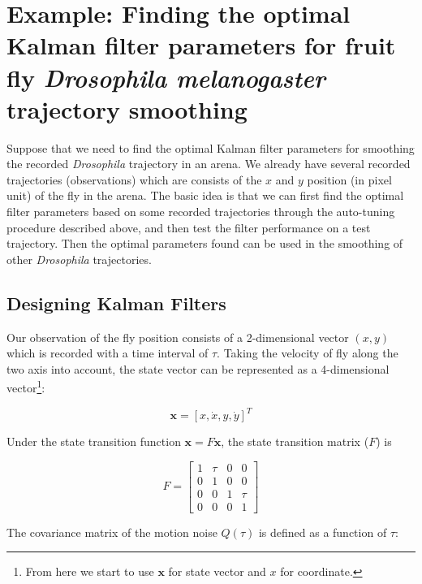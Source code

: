 \section{Example: Finding the optimal Kalman filter parameters for fruit fly \textit{Drosophila melanogaster} trajectory smoothing}

Suppose that we need to find the optimal Kalman filter parameters for smoothing the recorded \textit{Drosophila} 
trajectory in an arena.
We already have several recorded trajectories (observations) which are consists of the $x$ and $y$ position 
(in pixel unit) of the fly in the arena.
The basic idea is that we can first find the optimal filter parameters based on some recorded trajectories 
through the auto-tuning procedure described above, and then test the filter performance on a test trajectory.
Then the optimal parameters found can be used in the smoothing of other \textit{Drosophila} trajectories.

\subsection{Designing Kalman Filters}

Our observation of the fly position consists of a 2-dimensional vector $(x, y)$ which is recorded with a time interval of $\tau$.
Taking the velocity of fly along the two axis into account, the state vector can be represented as a 4-dimensional vector\footnote{From here we start to use $\mathbf{x}$ for state vector and $x$ for coordinate.}:

\begin{equation*}
    \mathbf{x} = [x, \dot{x}, y, \dot{y}]^T
\end{equation*}

Under the state transition function $\mathbf{x} = F\mathbf{x}$, the state transition matrix ($F$) is 

\begin{equation*}
    F = 
    \left[ 
      \begin{array}{cccc}
        1 & \tau & 0 & 0 \\
        0 & 1 & 0 & 0 \\
        0 & 0 & 1 & \tau \\
        0 & 0 & 0 & 1
      \end{array} 
    \right]
\end{equation*}

The covariance matrix of the motion noise $Q(\tau)$ is defined as a function of $\tau$:

